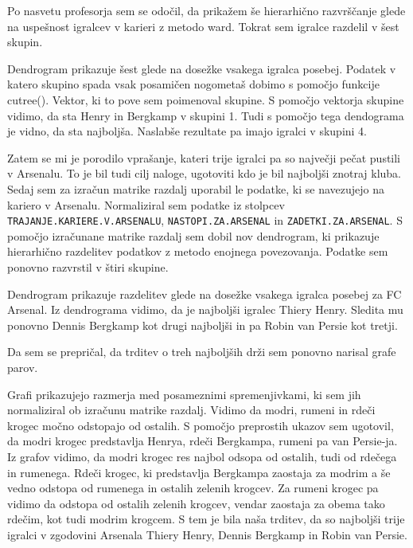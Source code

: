\documentclass[11pt,a4paper]{article}
\begin{document}
\newpage
Po nasvetu profesorja sem se odočil, da prikažem še hierarhično razvrščanje glede na uspešnost igralcev v karieri z metodo ward. Tokrat sem igralce razdelil v šest skupin. 


Dendrogram prikazuje šest glede na dosežke vsakega igralca posebej. Podatek v katero skupino spada vsak posamičen nogometaš dobimo s pomočjo funkcije cutree(). Vektor, ki to pove sem poimenoval skupine. S pomočjo vektorja skupine vidimo, da sta Henry in Bergkamp v skupini 1. Tudi s pomočjo tega dendograma je vidno, da sta najboljša. Naslabše rezultate pa imajo igralci v skupini 4.

\newpage
Zatem se mi je porodilo vprašanje, kateri trije igralci pa so največji pečat pustili v Arsenalu. To je bil tudi cilj naloge, ugotoviti kdo je bil najboljši znotraj kluba. Sedaj sem za izračun matrike razdalj uporabil le podatke, ki se navezujejo na kariero v Arsenalu. Normaliziral sem podatke iz stolpcev \verb|TRAJANJE.KARIERE.V.ARSENALU|, \verb|NASTOPI.ZA.ARSENAL| in \verb|ZADETKI.ZA.ARSENAL|. S pomočjo izračunane matrike razdalj sem dobil nov dendrogram, ki prikazuje hierarhično razdelitev podatkov z metodo enojnega povezovanja. Podatke sem ponovno razvrstil v štiri skupine.


Dendrogram prikazuje razdelitev glede na dosežke vsakega igralca posebej za FC Arsenal. Iz dendrograma vidimo, da je najboljši igralec Thiery Henry. Sledita mu ponovno Dennis Bergkamp kot drugi najboljši in pa Robin van Persie kot tretji.

\newpage
Da sem se prepričal, da trditev o treh najboljših drži sem ponovno narisal grafe parov.


Grafi prikazujejo razmerja med posameznimi spremenjivkami, ki sem jih normaliziral ob izračunu matrike razdalj. Vidimo da modri, rumeni in rdeči krogec močno odstopajo od ostalih. S pomočjo preprostih ukazov sem ugotovil, da modri krogec predstavlja Henrya, rdeči Bergkampa, rumeni pa van Persie-ja. Iz grafov vidimo, da modri krogec res najbol odsopa od ostalih, tudi od rdečega in rumenega. Rdeči krogec, ki predstavlja  Bergkampa zaostaja za modrim a še vedno odstopa od rumenega in ostalih zelenih krogcev. Za rumeni krogec pa vidimo da odstopa od ostalih zelenih krogcev, vendar zaostaja za obema tako rdečim, kot tudi modrim krogcem. S tem je bila naša trditev, da so najboljši trije igralci v zgodovini Arsenala Thiery Henry, Dennis Bergkamp in Robin van Persie.
\end{document}
